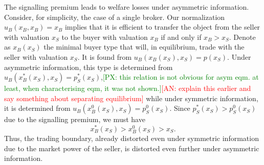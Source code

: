 \documentclass[11pt,twopage]{article}
\newcommand{\AN}[1]{\textcolor{red}{[AN: #1]}}
\newcommand{\PX}[1]{\textcolor{green}{[PX: #1]}}
\begin{document}
The signalling premium leads to welfare losses under asymmetric
information. Consider, for simplicity, the case of a single
broker. Our normalization $u_B(x_B,x_B) = x_B$ implies that it is
efficient to transfer the object from the seller with valuation $x_S$
to the buyer with valuation $x_B$ if and only if $x_B>x_S$. Denote as
$x_B(x_S)$ the minimal buyer type that will, in equilibrium, trade
with the seller with valuation $x_S$. It is found from
$u_B(x_B(x_S),x_S) = p(x_S)$. Under asymmetric information, this type
is determined from $u_B(x_B^*(x_S),x_S) = p_S^*(x_S)$,\PX{this relation is not obvious for asym eqm. at least, when characterising eqm, it was not shown.}\AN{explain this earlier
and say something about separating equilibrium} while under
symmetric information, it is determined from $u_B(x_B^0(x_S),x_S) =
p_S^0(x_S)$. Since $p_S^*(x_S)>p_S^0(x_S)$ due to the signalling
premium, we must have \[ x_B^*(x_S)>x_B^0(x_S)>x_S .\] Thus, the
trading boundary, already distorted even under symmetric information
due to the market power of the seller, is distorted even further under
asymmetric information.
\end{document}

